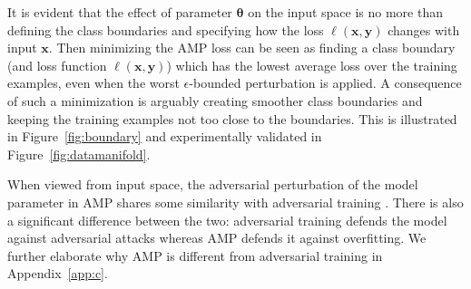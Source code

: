 \documentclass[final]{cvpr}
\begin{document}
It is evident that the effect of parameter $\boldsymbol{\theta}$ on the input space is no more than defining the class boundaries and specifying how the loss $\ell(\boldsymbol{x}, \boldsymbol{y})$ changes with input $\boldsymbol{x}$. Then minimizing the AMP loss can be seen as finding a class boundary (and loss function $\ell(\boldsymbol{x}, \boldsymbol{y})$) which has the lowest average loss over the training examples, even when the worst $\epsilon$-bounded perturbation is applied. A consequence of such a minimization is arguably creating smoother class boundaries and keeping the training examples not too close to the boundaries. This is illustrated in Figure~\ref{fig:boundary} and experimentally validated in Figure~\ref{fig:datamanifold}. 

When viewed from input space, the adversarial perturbation of the model parameter in AMP shares some similarity with adversarial training \cite{goodfellow2015explaining}. There is also a significant difference between the two: adversarial training defends the model against adversarial attacks whereas AMP defends it against overfitting. We further elaborate why AMP is different from adversarial training in Appendix~\ref{app:c}.
\end{document}
